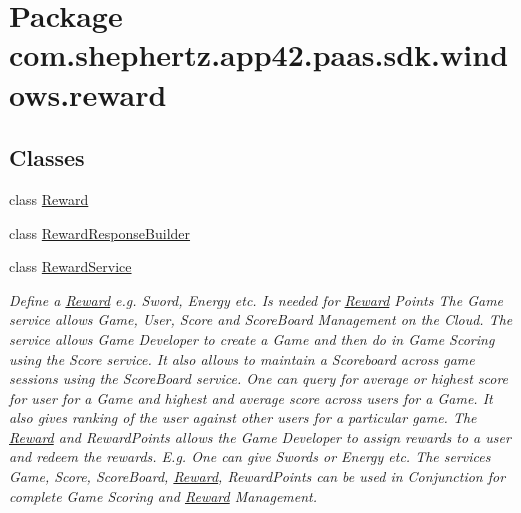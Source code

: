 \hypertarget{namespacecom_1_1shephertz_1_1app42_1_1paas_1_1sdk_1_1windows_1_1reward}{\section{Package com.\+shephertz.\+app42.\+paas.\+sdk.\+windows.\+reward}
\label{namespacecom_1_1shephertz_1_1app42_1_1paas_1_1sdk_1_1windows_1_1reward}
}
\subsection*{Classes}
\begin{DoxyCompactItemize}
\item 
class \hyperlink{classcom_1_1shephertz_1_1app42_1_1paas_1_1sdk_1_1windows_1_1reward_1_1_reward}{Reward}
\item 
class \hyperlink{classcom_1_1shephertz_1_1app42_1_1paas_1_1sdk_1_1windows_1_1reward_1_1_reward_response_builder}{Reward\+Response\+Builder}
\item 
class \hyperlink{classcom_1_1shephertz_1_1app42_1_1paas_1_1sdk_1_1windows_1_1reward_1_1_reward_service}{Reward\+Service}
\begin{DoxyCompactList}\small\item\em Define a \hyperlink{classcom_1_1shephertz_1_1app42_1_1paas_1_1sdk_1_1windows_1_1reward_1_1_reward}{Reward} e.\+g. Sword, Energy etc. Is needed for \hyperlink{classcom_1_1shephertz_1_1app42_1_1paas_1_1sdk_1_1windows_1_1reward_1_1_reward}{Reward} Points The Game service allows Game, User, Score and Score\+Board Management on the Cloud. The service allows Game Developer to create a Game and then do in Game Scoring using the Score service. It also allows to maintain a Scoreboard across game sessions using the Score\+Board service. One can query for average or highest score for user for a Game and highest and average score across users for a Game. It also gives ranking of the user against other users for a particular game. The \hyperlink{classcom_1_1shephertz_1_1app42_1_1paas_1_1sdk_1_1windows_1_1reward_1_1_reward}{Reward} and Reward\+Points allows the Game Developer to assign rewards to a user and redeem the rewards. E.\+g. One can give Swords or Energy etc. The services Game, Score, Score\+Board, \hyperlink{classcom_1_1shephertz_1_1app42_1_1paas_1_1sdk_1_1windows_1_1reward_1_1_reward}{Reward}, Reward\+Points can be used in Conjunction for complete Game Scoring and \hyperlink{classcom_1_1shephertz_1_1app42_1_1paas_1_1sdk_1_1windows_1_1reward_1_1_reward}{Reward} Management. \end{DoxyCompactList}\end{DoxyCompactItemize}

